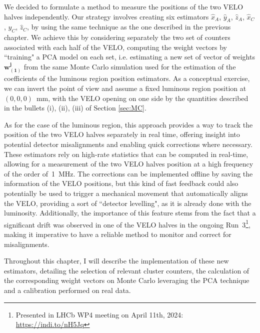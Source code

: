 We decided to formulate a method to measure the positions of the two VELO halves independently. 
Our strategy involves creating six estimators $\hat{x}_A$, $\hat{y}_A$, $\hat{z}_A$, $\hat{x}_C$, $\hat{y}_C$, $\hat{z}_C$, by using the same technique as the one described in the previous chapter. 
We achieve this by considering separately the two set of counters associated with each half of the VELO, computing the weight vectors by ``training" a PCA model on each set, i.e. estimating a new set of vector of weights $\mathbf{w^j_{(1)}}$ from the same Monte Carlo simulation used for the estimation of the coefficients of the luminous region position estimators.
As a conceptual exercise, we can invert the point of view and assume a fixed luminous region position at $(0,0,0)$~mm, with the VELO opening on one side by the quantities described in the bullets (i), (ii), (iii) of Section \ref{sec:MC}. 


As for the case of the luminous region, this approach provides a way to track the position of the two VELO halves separately in real time, offering insight into potential detector misalignments and enabling quick corrections where necessary. These estimators rely on high-rate statistics that can be computed in real-time, allowing for a measurement of the two VELO halves position at a high frequency of the order of~\SI{1}{\mega\hertz}. The corrections can be implemented offline by saving the information of the VELO positions, but this kind of fast feedback could also potentially be used to trigger a mechanical movement that automatically aligns the VELO, providing a sort of ``detector levelling", as it is already done with the luminosity. Additionally, the importance of this feature stems from the fact that a significant drift was observed in one of the VELO halves in the ongoing Run~3\footnote{Presented in LHCb WP4 meeting on April 11th, 2024: \url{https://indi.to/nH5Jq}}, making it imperative to have a reliable method to monitor and correct for misalignments.

Throughout this chapter, I will describe the implementation of these new estimators, detailing the selection of relevant cluster counters, the calculation of the corresponding weight vectors on Monte Carlo leveraging the PCA technique and a calibration performed on real data.




